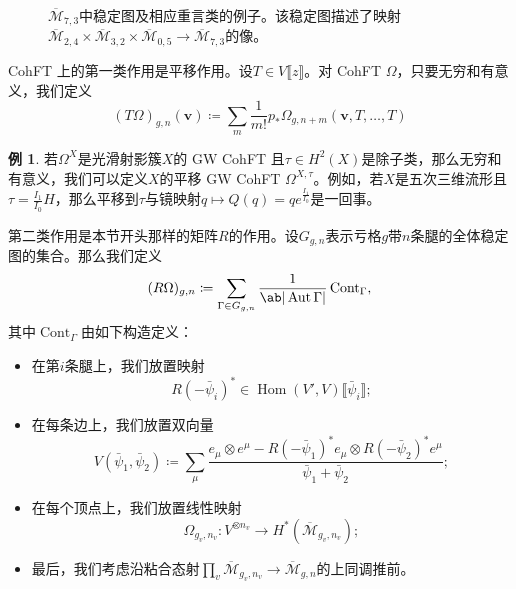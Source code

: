 \documentclass{amsart}
\theoremstyle{definition}
\newtheorem{exm}[thm]{例}
\theoremstyle{remark}
\theoremstyle{plain}
\theoremstyle{definition}
\theoremstyle{remark}
\newcommand{\Mbar}{\overline{\mathcal{M}}}
\newcommand{\mc}[1]{\mathcal{#1}}
\newcommand{\mbf}[1]{\mathbf{#1}}
\newcommand{\bv}{\mbf{v}}
\newcommand{\on}[1]{\operatorname{#1}}
\newcommand{\ol}[1]{\overline{#1}}
\newcommand{\1}{\mathbf{1}}
\newcommand{\2}{\mathbf{2}}
\newcommand{\3}{\mathbf{3}}
\newcommand{\ps}[1]{\llbracket #1 \rrbracket}
\DeclareMathOperator{\Hom}{Hom}
\DeclareMathOperator{\Aut}{Aut}
\begin{document}
\begin{figure}[htpb]
  \centering
  \caption{$\ol{\mc{M}}_{7,3}$中稳定图及相应重言类的例子。该稳定图描述了映射
    $\ol{\mc{M}}_{2,4} \times \ol{\mc{M}}_{3,2} \times \ol{\mc{M}}_{0,5} \to \ol{\mc{M}}_{7,3}$的像。}
  \label{fig:stablegraph}
\end{figure}

CohFT 上的第一类作用是平移作用。设$T \in V\ps{z}$。对 CohFT $\Omega$，只要无穷和有意义，我们定义
\[ (T\Omega)_{g,n}(\bv) \coloneqq \sum_m \frac{1}{m!} p_* \Omega_{g,n+m}(\bv, T,\ldots,T) \]

\begin{exm}
    若$\Omega^X$是光滑射影簇$X$的 GW CohFT 且$\tau \in H^2(X)$是除子类，那么无穷和有意义，我们可以定义$X$的平移 GW CohFT $\Omega^{X,\tau}$。例如，若$X$是五次三维流形且$\tau = \frac{I_1}{I_0} H$，那么平移到$\tau$与镜映射$q \mapsto Q(q) = q e^{\frac{I_1}{I_0}}$是一回事。
\end{exm}

第二类作用是本节开头那样的矩阵$R$的作用。设$G_{g,n}$表示亏格$g$带$n$条腿的全体稳定图的集合。那么我们定义
\[ (R\Omega)_{g,n} \coloneqq \sum_{\Gamma \in G_{g,n}} \frac{1}{\ab|\Aut \Gamma|} \on{Cont}_{\Gamma}, \]
其中$\on{Cont}_{\Gamma}$由如下构造定义：
\begin{itemize}
    \item 在第$i$条腿上，我们放置映射
        \[ R(-\bar{\psi}_i)^* \in \Hom(V',V) \ps{\bar{\psi}_i}; \]
    \item 在每条边上，我们放置双向量
        \[ V(\bar{\psi}_1, \bar{\psi}_2) \coloneqq \sum_{\mu} \frac{e_{\mu} \otimes e^{\mu} - R(-\bar{\psi}_1)^* e_{\mu} \otimes R(-\bar{\psi}_2)^* e^{\mu}}{\bar{\psi}_1 + \bar{\psi}_2}; \]
    \item 在每个顶点上，我们放置线性映射
        \[ \Omega_{g_v, n_v} \colon V^{\otimes n_v} \to H^*(\Mbar_{g_v, n_v}); \]
    \item 最后，我们考虑沿粘合态射$\prod_v \Mbar_{g_v, n_v} \to \Mbar_{g,n}$的上同调推前。
\end{itemize}
\end{document}
